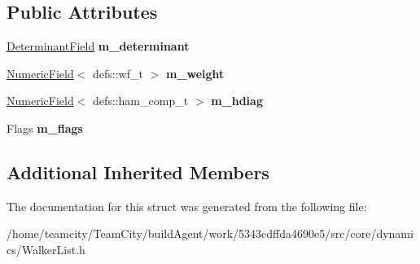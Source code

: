 \subsection*{Public Attributes}
\begin{DoxyCompactItemize}
\item 
\hyperlink{classDeterminantField}{Determinant\+Field} {\bfseries m\+\_\+determinant}\hypertarget{structWalkerList_afdc4b394bf3c1731843cb64674a346a3}{}\label{structWalkerList_afdc4b394bf3c1731843cb64674a346a3}

\item 
\hyperlink{classNumericField}{Numeric\+Field}$<$ defs\+::wf\+\_\+t $>$ {\bfseries m\+\_\+weight}\hypertarget{structWalkerList_a1dbed384ca6ae915a96104098c7d2332}{}\label{structWalkerList_a1dbed384ca6ae915a96104098c7d2332}

\item 
\hyperlink{classNumericField}{Numeric\+Field}$<$ defs\+::ham\+\_\+comp\+\_\+t $>$ {\bfseries m\+\_\+hdiag}\hypertarget{structWalkerList_aca17e4a2b7e3f6cd7c57a555c48d229f}{}\label{structWalkerList_aca17e4a2b7e3f6cd7c57a555c48d229f}

\item 
Flags {\bfseries m\+\_\+flags}\hypertarget{structWalkerList_a1c6e5fa8f6f791796209680ae700cd46}{}\label{structWalkerList_a1c6e5fa8f6f791796209680ae700cd46}

\end{DoxyCompactItemize}
\subsection*{Additional Inherited Members}


The documentation for this struct was generated from the following file\+:\begin{DoxyCompactItemize}
\item 
/home/teamcity/\+Team\+City/build\+Agent/work/5343cdffda4690e5/src/core/dynamics/Walker\+List.\+h\end{DoxyCompactItemize}
